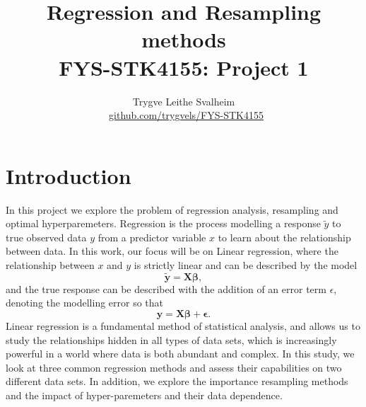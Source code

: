 \documentclass[a4paper, twocolumn]{article}
\title{{\sc Regression and Resampling methods \\ {\large FYS-STK4155: Project 1}}}
\author{Trygve Leithe Svalheim \\ \faGithub \ {\small \href{https://github.com/trygvels/FYS-STK4155}{github.com/trygvels/FYS-STK4155}}}
\begin{document}
\clearpage
\section{Introduction}

In this project we explore the problem of regression analysis, resampling and optimal hyperparemeters. Regression is the process modelling a response $\tilde{y}$ to true observed data $y$ from a predictor variable $x$ to learn about the relationship between data. In this work, our focus will be on Linear regression, where the relationship between $x$ and $y$ is strictly linear and can be described by the model
\begin{equation}
  \mathbf{\tilde{y}} = \mathbf{X}\mathbf{\beta},
\end{equation}
and the true response can be described with the addition of an error term $\epsilon$, denoting the modelling error so that
\begin{equation}
  \mathbf{y} = \mathbf{X}\mathbf{\beta}+\mathbf{\epsilon}.
\end{equation}
Linear regression is a fundamental method of statistical analysis, and allows us to study the relationships hidden in all types of data sets, which is increasingly powerful in a world where data is both abundant and complex.
In this study, we look at three common regression methods and assess their capabilities on two different data sets. In addition, we explore the importance resampling methods and the impact of hyper-paremeters and their data dependence.
\end{document}
